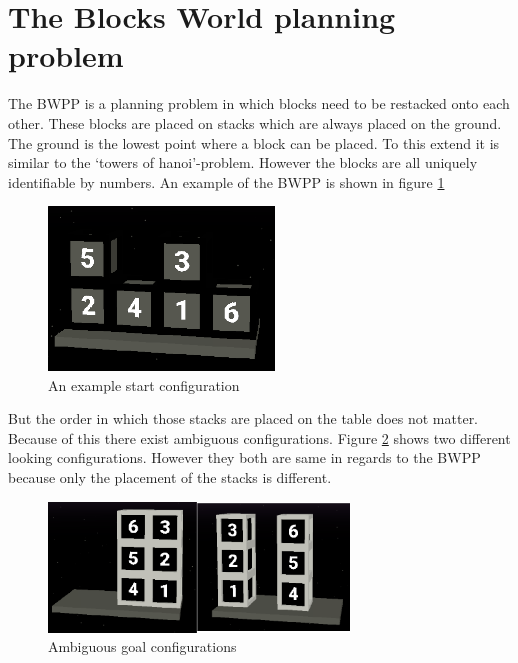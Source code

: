 \documentclass[runningheads]{llncs}
\begin{document}
    \section{The Blocks World planning problem}
        The BWPP is a planning problem in which blocks need to be restacked onto each other.
        These blocks are placed on stacks which are always placed on the ground.
        The ground is the lowest point where a block can be placed.
        To this extend it is similar to the `towers of hanoi'-problem.
        However the blocks are all uniquely identifiable by numbers.
        An example of the BWPP is shown in figure \ref{startConfiguration}

        \begin{figure}[h]
            \centering
            \includegraphics[width=6cm]{start_config.png}
            \caption{An example start configuration}
            \label{startConfiguration}
        \end{figure}

        But the order in which those stacks are placed on the table does not matter.
        Because of this there exist ambiguous configurations.
        Figure \ref{ambiguousGoalConfig} shows two different looking configurations.
        However they both are same in regards to the BWPP because only the placement of the stacks is different.
        
        \begin{figure}[h]
            \centering
            \includegraphics[width=8cm]{ambiguous_goal_config.png}
            \caption{Ambiguous goal configurations}
            \label{ambiguousGoalConfig}
        \end{figure}
\end{document}
